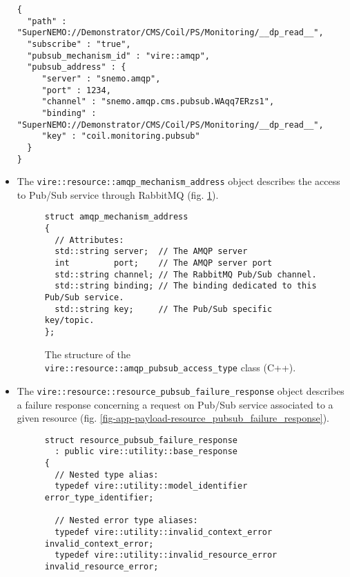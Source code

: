 \begin{itemize}
\small
\begin{Verbatim}[frame=single,xleftmargin=0.cm,label=\fbox{JSON++}]
{
  "path" : "SuperNEMO://Demonstrator/CMS/Coil/PS/Monitoring/__dp_read__",
  "subscribe" : "true",
  "pubsub_mechanism_id" : "vire::amqp",
  "pubsub_address" : {
     "server" : "snemo.amqp",
     "port" : 1234,
     "channel" : "snemo.amqp.cms.pubsub.WAqq7ERzs1",
     "binding" : "SuperNEMO://Demonstrator/CMS/Coil/PS/Monitoring/__dp_read__",
     "key" : "coil.monitoring.pubsub"
  }
}
\end{Verbatim}
\normalsize

\item    The   \texttt{vire::resource::amqp\_mechanism\_address}    object
  describes   the  access   to   Pub/Sub   service  through   RabbitMQ
  (fig. \ref{fig-app-payload-amqp_pubsub_access_type}).

\begin{figure}[h]
\vskip 10pt
\small
\begin{Verbatim}[frame=single,xleftmargin=0.cm,label=\fbox{C++}]
struct amqp_mechanism_address
{
  // Attributes:
  std::string server;  // The AMQP server
  int         port;    // The AMQP server port
  std::string channel; // The RabbitMQ Pub/Sub channel.
  std::string binding; // The binding dedicated to this Pub/Sub service.
  std::string key;     // The Pub/Sub specific key/topic.
};
\end{Verbatim}
\normalsize
\caption{The structure of the \texttt{vire::resource::amqp\_pubsub\_access\_type}
  class (C++).}
\label{fig-app-payload-amqp_pubsub_access_type}
\end{figure}


\item The \texttt{vire::resource::resource\_pubsub\_failure\_response}
  object describes a failure response  concerning a request on Pub/Sub
  service       associated       to       a       given       resource
  (fig. \ref{fig-app-payload-resource_pubsub_failure_response}).


\begin{figure}[h]
\vskip 10pt
\small
\begin{Verbatim}[frame=single,xleftmargin=0.cm,label=\fbox{C++}]
struct resource_pubsub_failure_response
  : public vire::utility::base_response
{
  // Nested type alias:
  typedef vire::utility::model_identifier error_type_identifier;

  // Nested error type aliases:
  typedef vire::utility::invalid_context_error  invalid_context_error;
  typedef vire::utility::invalid_resource_error invalid_resource_error;


\end{Verbatim}
\end{figure}
\end{itemize}
